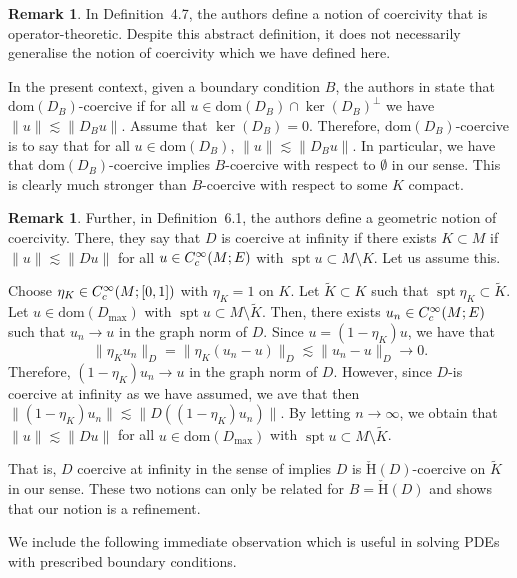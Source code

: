 \documentclass[a4paper,10pt,reqno]{amsart}
\newcommand{\norm}[1]{\| #1 \|}%
\newcommand{\Ck}[2][{}]{{\rm C}^{#2}_{\rm #1}}%
\newcommand{\checkH}{\check{\mathrm{H}}}
\newcommand{\dom}{\mathrm{dom}}
\DeclareMathOperator{\spt}{spt}%
\theoremstyle{definition}
\newtheorem{remark}[theorem]{Remark}
\begin{document}
\begin{remark}
In \cite{GN} Definition~4.7, the authors define a notion of coercivity that is operator-theoretic.
Despite this abstract definition, it does not necessarily generalise the notion of coercivity which we have defined here.

In the present context, given a boundary condition $B$, the authors in \cite{GN} state that $\dom(D_B)$-coercive if for all $u \in \dom(D_B) \cap \ker(D_B)^\perp$ we have $\norm{u} \lesssim \norm{D_B u}$.
Assume that $\ker(D_B) = 0$.
Therefore, $\dom(D_B)$-coercive is to say that for all $u \in \dom(D_B)$, $\norm{u} \lesssim \norm{D_B u}$.
In particular, we have that $\dom(D_B)$-coercive implies $B$-coercive with respect to $\emptyset$ in our sense.
This is clearly much stronger than $B$-coercive with respect to some $K$ compact.
\end{remark}

\begin{remark}
Further, in \cite{GN} Definition~6.1, the authors define a geometric notion of coercivity.
There, they say that $D$ is coercive at infinity if there exists $K \subset M$ if $\norm{u} \lesssim \norm{Du}$ for all $u \in \Ck[c]{\infty}(M;E)$ with $\spt u \subset M \setminus K$.
Let us assume this.

Choose $\eta_K \in \Ck[c]{\infty}(M;[0,1])$ with $\eta_K = 1$ on $K$.
Let $\tilde{K} \subset K$ such that $\spt \eta_K \subset \tilde{K}$.
Let $u \in \dom(D_{\max})$ with $\spt u \subset M \setminus \tilde{K}$.
Then,  there exists $u_n \in \Ck[c]{\infty}(M;E)$ such that $u_n \to u$ in the graph norm of $D$.
Since $u = (1 - \eta_K)u$, we have that
$$ \norm{\eta_K u_n}_D = \norm{\eta_K (u_n - u)}_D \lesssim \norm{u_n - u}_D \to 0.$$
Therefore, $(1 - \eta_K)u_n \to u$ in the graph norm of $D$.
However, since $D$-is coercive at infinity  as we have assumed, we ave that then  $\norm{(1 - \eta_K)u_n} \lesssim \norm{D((1 - \eta_K) u_n)}$.
By letting $n \to \infty$, we obtain that $\norm{u} \lesssim \norm{Du}$ for all $u \in \dom(D_{\max})$ with $\spt u \subset M \setminus \tilde{K}$.

That is, $D$ coercive at infinity in the sense of \cite{GN} implies $D$ is $\checkH(D)$-coercive on $\tilde{K}$ in our sense.
These two notions can only be related for $B = \checkH(D)$ and shows that our notion is a refinement.
\end{remark}



We include the following immediate observation which is useful in solving PDEs with prescribed boundary conditions.
\end{document}
